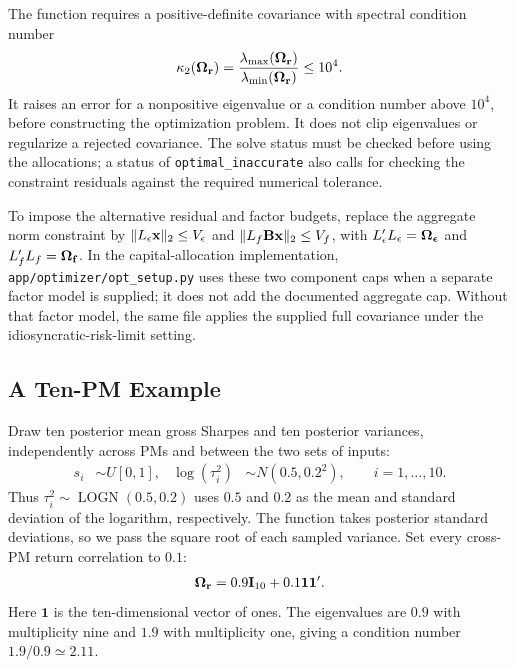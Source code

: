\documentclass[11pt]{gappyarticle}
\begin{document}

The function requires a positive-definite covariance with spectral
condition number
\begin{align}
    \kappa_2({\boldsymbol{\Omega}}_{\mathbf{r}})
       =\frac{\lambda_{\max}({\boldsymbol{\Omega}}_{\mathbf{r}})}
              {\lambda_{\min}({\boldsymbol{\Omega}}_{\mathbf{r}})}\leq10^4.
\end{align}
It raises an error for a nonpositive eigenvalue or a condition number
above $10^4$, before constructing the optimization problem. It does not
clip eigenvalues or regularize a rejected covariance.
The solve status must be checked before using the allocations; a status
of \texttt{optimal\_inaccurate} also calls for checking the constraint
residuals against the required numerical tolerance.

To impose the alternative residual and factor budgets, replace the
aggregate norm constraint by
$\|L_\epsilon{\mathbf{x}}\|_2\leq V_\epsilon$ and
$\|L_f{\mathbf{B}}{\mathbf{x}}\|_2\leq V_f$, with
$L_\epsilon' L_\epsilon={\boldsymbol{\Omega}}_{\boldsymbol{\epsilon}}$ and
$L_f' L_f={\boldsymbol{\Omega}}_{\mathbf{f}}$.
In the capital-allocation implementation, \texttt{app/optimizer/opt\_setup.py}
uses these two component caps when a separate factor model is supplied;
it does not add the documented aggregate cap. Without that factor model,
the same file applies the supplied full covariance under the
idiosyncratic-risk-limit setting.

\subsection{A Ten-PM Example}
Draw ten posterior mean gross Sharpes and ten posterior variances,
independently across PMs and between the two sets of inputs:
\begin{align}
    s_i&\sim U[0,1],&
    \log(\tau_i^2)&\sim N(0.5,0.2^2),
    \qquad i=1,\ldots,10.
\end{align}
Thus $\tau_i^2\sim\operatorname{LOGN}(0.5,0.2)$ uses $0.5$ and $0.2$
as the mean and standard deviation of the logarithm, respectively.
The function takes posterior standard deviations, so we pass the square
root of each sampled variance. Set every cross-PM return correlation to
$0.1$:
\begin{align}
    {\boldsymbol{\Omega}}_{\mathbf{r}}=0.9{\mathbf{I}}_{10}
                     +0.1\mathbf{1}\mathbf{1}'.
\end{align}
Here $\mathbf{1}$ is the ten-dimensional vector of ones.
The eigenvalues are $0.9$ with multiplicity nine and $1.9$ with
multiplicity one, giving a condition number $1.9/0.9\simeq2.11$.
\end{document}
